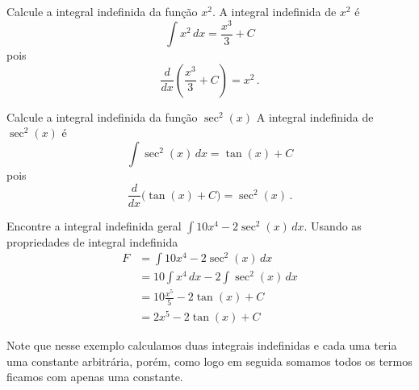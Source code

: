 \begin{example}
  Calcule a integral indefinida da função \(x^2\).
  \solution
    A integral indefinida de \(x^2\) é
    \[
      \int x^2 \,dx = \frac{x^3}{3} + C
    \]
    pois
    \[
      \frac{d}{dx} \left( \frac{x^3}{3}+C \right) = x^2 \,.
    \]
\end{example}

\begin{example}
  Calcule a integral indefinida da função \(\sec^2(x)\)
  \solution
    A integral indefinida de \(\sec^2(x)\) é
    \[
      \int \sec^2(x) \,dx = \tan(x)+C
    \]
    pois
    \[
      \frac{d}{dx} \big( \tan(x)+C \big) = \sec^2(x) \,.
    \]
\end{example}

\begin{example}
  Encontre a integral indefinida geral \(\int 10x^4 -2\sec^2(x) \,dx\).
  \solution
  Usando as propriedades de integral indefinida
  \begin{align*}
    F
    & = \int 10x^4 - 2\sec^2(x) \,dx \\[2mm]
    & = 10 \int x^4 \,dx - 2 \int \sec^2(x) \,dx \\[2mm]
    & = 10 \frac{x^5}{5} - 2\tan(x) + C \\[2mm]
    & = 2x^5 - 2\tan(x) + C
  \end{align*}
\end{example}

Note que nesse exemplo calculamos duas integrais indefinidas e cada uma
teria uma constante arbitrária, porém, como logo em seguida somamos todos
os termos ficamos com apenas uma constante.

